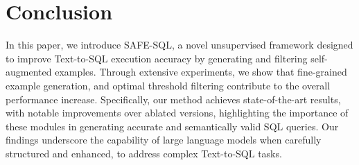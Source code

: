 




\section{Conclusion}
In this paper, we introduce SAFE-SQL, a novel unsupervised framework designed to improve Text-to-SQL execution accuracy by generating and filtering self-augmented examples. Through extensive experiments, we show that fine-grained example generation, and optimal threshold filtering contribute to the overall performance increase. Specifically, our method achieves state-of-the-art results, with notable improvements over ablated versions, highlighting the importance of these modules in generating accurate and semantically valid SQL queries. Our findings underscore the capability of large language models when carefully structured and enhanced, to address complex Text-to-SQL tasks.

